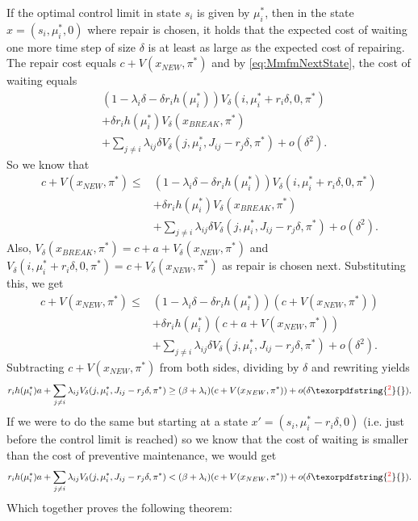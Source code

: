 \documentclass[a4paper]{thesis}
\theoremstyle{definition}
\providecommand{\DIFdeltex}[1]{{\protect\color{red}\sout{#1}}}                      %
\providecommand{\DIFdelbegin}{} %
\providecommand{\DIFdelend}{} %
\providecommand{\DIFdel}[1]{\texorpdfstring{\DIFdeltex{#1}}{}} %
\newcommand{\DIFscaledelfig}{0.5}
\newlength{\DIFdelgraphicswidth} %
\newlength{\DIFdelgraphicsheight} %
\newcommand{\DIFdelincludegraphics}[2][]{%
	\sbox{\DIFdelgraphicsbox}{\DIFOincludegraphics[#1]{#2}}%
	\settoboxwidth{\DIFdelgraphicswidth}{\DIFdelgraphicsbox} %
	\settoboxtotalheight{\DIFdelgraphicsheight}{\DIFdelgraphicsbox} %
	\scalebox{\DIFscaledelfig}{%
		\parbox[b]{\DIFdelgraphicswidth}{\usebox{\DIFdelgraphicsbox}\\[-\baselineskip] \rule{\DIFdelgraphicswidth}{0em}}\llap{\resizebox{\DIFdelgraphicswidth}{\DIFdelgraphicsheight}{%
				\setlength{\unitlength}{\DIFdelgraphicswidth}%
				\begin{picture}(1,1)%
				\thicklines\linethickness{2pt} %
				{\color[rgb]{1,0,0}\put(0,0){\framebox(1,1){}}}%
				{\color[rgb]{1,0,0}\put(0,0){\line( 1,1){1}}}%
				{\color[rgb]{1,0,0}\put(0,1){\line(1,-1){1}}}%
				\end{picture}%
			}\hspace*{3pt}}} %
} %
\DeclareRobustCommand{\DIFdelbegin}{\DIFOdelbegin \let\includegraphics\DIFdelincludegraphics} %
\DeclareRobustCommand{\DIFdelend}{\DIFOaddend \let\includegraphics\DIFOincludegraphics} %
\begin{document}
	If the optimal control limit in state $s_i$ is given by $\mu_i^*$, then in the state $x=(s_i,\mu_i^*,0)$ where repair is chosen, it holds that the expected cost of waiting one more time step of size $\delta$ is at least as large as the expected cost of repairing.
	The repair cost equals $c+V(x_{NEW},\pi^*)$ and by \eqref{eq:MmfmNextState}, the cost of waiting equals
	\[
	\begin{split}
	&(1-\lambda_i \delta-\delta r_ih(\mu_i^*))V_\delta(i,\mu_i^*+r_i\delta,0,\pi^*)\\
	&+ \delta r_ih(\mu_i^*)V_\delta(x_{BREAK},\pi^*)\\
	&+\sum\limits_{j\neq i}\lambda_{ij} \delta V_\delta(j,\mu_i^*,J_{ij}-r_j\delta,\pi^*)+o(\delta^2).
	\end{split}
	\]
	So we know that
	\[
	\begin{split}
	c+V(x_{NEW},\pi^*)\leq 
	&(1-\lambda_i \delta-\delta r_ih(\mu_i^*))V_\delta(i,\mu_i^*+r_i\delta,0,\pi^*)\\
	&+ \delta r_ih(\mu_i^*)V_\delta(x_{BREAK},\pi^*)\\
	&+\sum\limits_{j\neq i}\lambda_{ij} \delta V_\delta(j,\mu_i^*,J_{ij}-r_j\delta,\pi^*)+o(\delta^2).
	\end{split}
	\]
	Also, $V_\delta(x_{BREAK},\pi^*)=c+a+V_\delta(x_{NEW},\pi^*)$ and $V_\delta(i,\mu_i^*+r_i\delta,0,\pi^*)=c+V_\delta(x_{NEW},\pi^*)$ as repair is chosen next.
	Substituting this, we get
	\[\begin{split}
	c+V(x_{NEW},\pi^*)\leq
	&(1-\lambda_i \delta-\delta r_ih(\mu_i^*))(c+V(x_{NEW},\pi^*))\\
	&+ \delta r_ih(\mu_i^*)(c+a+V(x_{NEW},\pi^*))\\
	&+\sum\limits_{j\neq i}\lambda_{ij} \delta V_\delta(j,\mu_i^*,J_{ij}-r_j\delta,\pi^*)+o(\delta^2).
	\end{split}
	\]
	Subtracting $c+V(x_{NEW},\pi^*)$ from both sides, dividing by $\delta$ and rewriting yields
	\[
	r_ih(\mu_i^*)a+\sum\limits_{j\neq i}\lambda_{ij} V_\delta(j,\mu_i^*,J_{ij}-r_j\delta,\pi^*)\geq
	(\beta+\lambda_i)(c+V(x_{NEW},\pi^*))+o(\delta\DIFdelbegin \DIFdel{^2}\DIFdelend ).
	\]
	If we were to do the same but starting at a state $x'=(s_i,\mu_i^*-r_i\delta,0)$ (i.e. just before the control limit is reached) so we know that the cost of waiting is smaller than the cost of preventive maintenance, we would get
	\[
	r_ih(\mu_i^*)a+\sum\limits_{j\neq i}\lambda_{ij} V_\delta(j,\mu_i^*,J_{ij}-r_j\delta,\pi^*)<
	(\beta+\lambda_i)(c+V(x_{NEW},\pi^*))+o(\delta\DIFdelbegin \DIFdel{^2}\DIFdelend ).
	\]
	Which together proves the following theorem:
\end{document}
